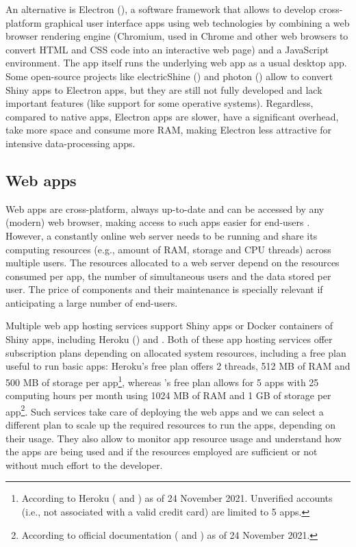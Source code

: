 An alternative is Electron (), a software framework that allows to develop cross-platform graphical user interface apps using web technologies by combining a web browser rendering engine (Chromium, used in Chrome and other web browsers to convert HTML and CSS code into an interactive web page) and a JavaScript environment. The app itself runs the underlying web app as a usual desktop app. Some open-source projects like electricShine () and photon () allow to convert Shiny apps to Electron apps, but they are still not fully developed and lack important features (like support for some operative systems). Regardless, compared to native apps, Electron apps are slower, have a significant overhead, take more space and consume more RAM, making Electron less attractive for intensive data-processing apps.

\subsection{Web apps}

Web apps are cross-platform, always up-to-date and can be accessed by any (modern) web browser, making access to such apps easier for end-users \cite{silva:2017wl}. However, a constantly online web server needs to be running and share its computing resources (e.g., amount of RAM, storage and CPU threads) across multiple users. The resources allocated to a web server depend on the resources consumed per app, the number of simultaneous users and the data stored per user. The price of components and their maintenance is specially relevant if anticipating a large number of end-users.

Multiple web app hosting services support Shiny apps or Docker containers of Shiny apps, including Heroku () and . Both of these app hosting services offer subscription plans depending on allocated system resources, including a free plan useful to run basic apps: Heroku's free plan offers 2 threads, 512 MB of RAM and 500 MB of storage per app\footnote{According to Heroku ( and ) as of 24 November 2021. Unverified accounts (i.e., not associated with a valid credit card) are limited to 5 apps.}, whereas 's free plan allows for 5 apps with 25 computing hours per month using 1024 MB of RAM and 1 GB of storage per app\footnote{According to official  documentation ( and ) as of 24 November 2021.}. Such services take care of deploying the web apps and we can select a different plan to scale up the required resources to run the apps, depending on their usage. They also allow to monitor app resource usage and understand how the apps are being used and if the resources employed are sufficient or not without much effort to the developer.

